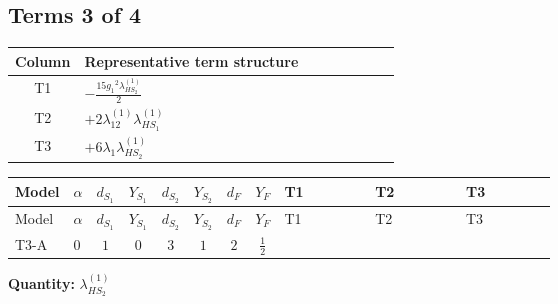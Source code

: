 \documentclass[8pt]{article}
\begin{document}
\begin{landscape}
\subsection*{Terms 3 of 4}
\begin{center}
\begin{tabular}{@{}c >{\raggedright\arraybackslash}p{0.82\linewidth}@{}}
\toprule
Column & Representative term structure \\
\midrule
T1 & \(\displaystyle -\frac{15 {g_1}^2 {\lambda_{HS_2}^{(1)}}}{2}\) \\
\midrule
T2 & \(\displaystyle +2 {\lambda_{12}^{(1)}} {\lambda_{HS_1}^{(1)}}\) \\
\midrule
T3 & \(\displaystyle +6 {\lambda_1} {\lambda_{HS_2}^{(1)}}\) \\
\midrule
\bottomrule
\end{tabular}
\end{center}
\smallskip
\tiny
\begin{longtable}{@{}llcccccc >{\raggedright\arraybackslash}p{0.21\linewidth} >{\raggedright\arraybackslash}p{0.21\linewidth} >{\raggedright\arraybackslash}p{0.21\linewidth}@{}}
\toprule
Model & $\alpha$ & $d_{S_1}$ & $Y_{S_1}$ & $d_{S_2}$ & $Y_{S_2}$ & $d_F$ & $Y_F$ & T1 & T2 & T3 \\
\midrule
\endfirsthead
\toprule
Model & $\alpha$ & $d_{S_1}$ & $Y_{S_1}$ & $d_{S_2}$ & $Y_{S_2}$ & $d_F$ & $Y_F$ & T1 & T2 & T3 \\
\midrule
\endhead
T3-A & $0$ & $1$ & $0$ & $3$ & $1$ & $2$ & $\frac{1}{2}$ & \scriptsize\adjustbox{max width=\linewidth}{$\begin{gathered} -\frac{15 {g_1}^2 {\lambda_{HS_2}^{(1)}}}{2}\end{gathered}$} & \scriptsize\adjustbox{max width=\linewidth}{$\begin{gathered} +2 {\lambda_{12}^{(1)}} {\lambda_{HS_1}^{(1)}}\end{gathered}$} & \scriptsize\adjustbox{max width=\linewidth}{$\begin{gathered} +6 {\lambda_1} {\lambda_{HS_2}^{(1)}}\end{gathered}$} \\
\midrule
\bottomrule
\end{longtable}
\clearpage
\noindent\textbf{Quantity: }$\lambda_{HS_2}^{(1)}$\par\smallskip

\end{landscape}
\end{document}
